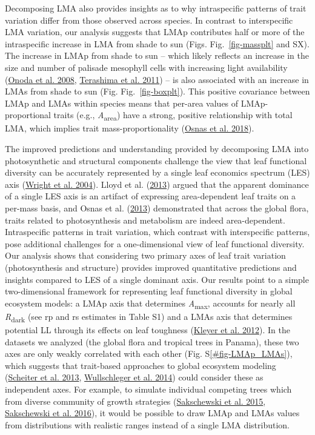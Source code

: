 \documentclass[
  12pt,
  a4paper,
,tablecaptionabove
]{scrartcl}
\begin{document}
Decomposing LMA also provides insights as to why intraspecific patterns
of trait variation differ from those observed across species. In
contrast to interspecific LMA variation, our analysis suggests that LMAp
contributes half or more of the intraspecific increase in LMA from shade
to sun (Figs. Fig.~\ref{fig-massplt} and SX). The increase in LMAp from
shade to sun -- which likely reflects an increase in the size and number
of palisade mesophyll cells with increasing light availability
(\protect\hyperlink{ref-Onoda2008}{Onoda et al. 2008},
\protect\hyperlink{ref-Terashima2011}{Terashima et al. 2011}) -- is also
associated with an increase in LMAs from shade to sun (Fig.
Fig.~\ref{fig-boxplt}). This positive covariance between LMAp and LMAs
within species means that per-area values of LMAp-proportional traits
(e.g., \emph{A}\textsubscript{area}) have a strong, positive
relationship with total LMA, which implies trait mass-proportionality
(\protect\hyperlink{ref-Osnas2018}{Osnas et al. 2018}).

The improved predictions and understanding provided by decomposing LMA
into photosynthetic and structural components challenge the view that
leaf functional diversity can be accurately represented by a single leaf
economics spectrum (LES) axis
(\protect\hyperlink{ref-Wright2004a}{Wright et al. 2004}). Lloyd et al.
(\protect\hyperlink{ref-Lloyd2013}{2013}) argued that the apparent
dominance of a single LES axis is an artifact of expressing
area-dependent leaf traits on a per-mass basis, and Osnas et al.
(\protect\hyperlink{ref-Osnas2013}{2013}) demonstrated that across the
global flora, traits related to photosynthesis and metabolism are indeed
area-dependent. Intraspecific patterns in trait variation, which
contrast with interspecific patterns, pose additional challenges for a
one-dimensional view of leaf functional diversity. Our analysis shows
that considering two primary axes of leaf trait variation
(photosynthesis and structure) provides improved quantitative
predictions and insights compared to LES of a single dominant axis. Our
results point to a simple two-dimensional framework for representing
leaf functional diversity in global ecosystem models: a LMAp axis that
determines \emph{A}\textsubscript{max}, accounts for nearly all
\emph{R}\textsubscript{dark} (see rp and rs estimates in Table S1) and a
LMAs axis that determines potential LL through its effects on leaf
toughness (\protect\hyperlink{ref-Kleyer2012}{Kleyer et al. 2012}). In
the datasets we analyzed (the global flora and tropical trees in
Panama), these two axes are only weakly correlated with each other (Fig.
S\ref{#fig-LMAp_LMAs}), which suggests that trait-based approaches to
global ecosystem modeling (\protect\hyperlink{ref-Scheiter2013}{Scheiter
et al. 2013}, \protect\hyperlink{ref-Wullschleger2014}{Wullschleger et
al. 2014}) could consider these as independent axes. For example, to
simulate individual competing trees which from diverse community of
growth strategies (\protect\hyperlink{ref-Sakschewski2015}{Sakschewski
et al. 2015}, \protect\hyperlink{ref-Sakschewski2016}{Sakschewski et al.
2016}), it would be possible to draw LMAp and LMAs values from
distributions with realistic ranges instead of a single LMA
distribution.
\end{document}

